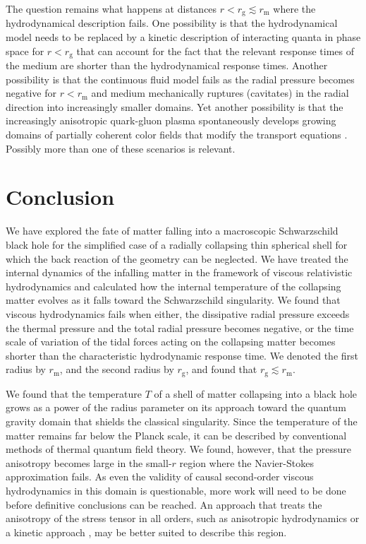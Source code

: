 \documentclass[article,twocolumn]{revtex4}
\begin{document}
The question remains what happens at distances $r < r_\mathrm{g} \lesssim r_\mathrm{m}$ where the hydrodynamical description fails. One possibility is that the hydrodynamical model needs to be replaced by a kinetic description of interacting quanta in phase space for $r < r_\mathrm{g}$ that can account for the fact that the relevant response times of the medium are shorter than the hydrodynamical response times. Another possibility is that the continuous fluid model fails as the radial pressure becomes negative for $r < r_\mathrm{m}$ and medium mechanically ruptures (cavitates) in the radial direction into increasingly smaller domains. Yet another possibility is that the increasingly anisotropic quark-gluon plasma spontaneously develops growing domains of partially coherent color fields that modify the transport equations \cite{Asakawa:2006tc,Asakawa:2006jn}. Possibly more than one of these scenarios is relevant.


\section{Conclusion}

We have explored the fate of matter falling into a macroscopic Schwarzschild black hole for the simplified case of a radially collapsing thin spherical shell for which the back reaction of the geometry can be neglected. We have treated the internal dynamics of the infalling matter in the framework of viscous relativistic hydrodynamics and calculated how the internal temperature of the collapsing matter evolves as it falls toward the Schwarzschild singularity. We found that viscous hydrodynamics fails when either, the dissipative radial pressure exceeds the thermal pressure and the total radial pressure becomes negative, or the time scale of variation of the tidal forces acting on the collapsing matter becomes shorter than the characteristic hydrodynamic response time. We denoted the first radius by $r_\mathrm{m}$, and the second radius by $r_\mathrm{g}$, and found that $r_\mathrm{g} \lesssim r_\mathrm{m}$.

We found that the temperature $T$ of a shell of matter collapsing into a black hole grows as a power of the radius parameter on its approach toward the quantum gravity domain that shields the classical singularity. Since the temperature of the matter remains far below the Planck scale, it can be described by conventional methods of thermal quantum field theory. We found, however, that the pressure anisotropy becomes large in the small-$r$ region where the Navier-Stokes approximation fails. As even the validity of causal second-order viscous hydrodynamics in this domain is questionable, more work will need to be done before definitive conclusions can be reached. An approach that treats the anisotropy of the stress tensor in all orders, such as anisotropic hydrodynamics \cite{Florkowski:2010cf,Bazow:2013ifa} or a kinetic approach \cite{Florkowski:2017olj}, may be better suited to describe this region. 
\end{document}
